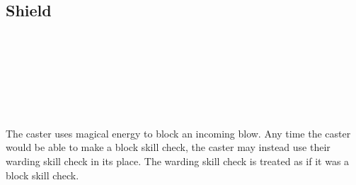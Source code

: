 \subsection*{Shield}
 \\
 \\
 \\
 \\
 \\
 \\

The caster uses magical energy to block an incoming blow. Any time the
caster would be able to make a block skill check, the caster may
instead use their warding skill check in its place. The warding skill
check is treated as if it was a block skill check.

